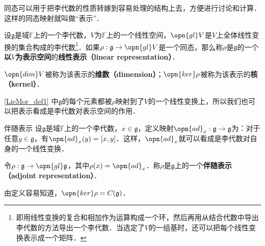 同态可以用于把李代数的性质转嫁到容易处理的结构上去，方便进行讨论和计算．这样的同态映射就叫做“表示”．

\begin{definition}{}\label{LieMor_def1}
设$\mathfrak{g}$是域$\mathbb{F}$上的一个李代数，$V$为$\mathbb{F}$上的一个线性空间，$\opn{gl}V$是$V$上全体线性变换的集合构成的李代数\footnote{即用线性变换的复合和相加作为运算构成一个环，然后再用从结合代数中导出李代数的方法导出一个李代数．当选定了$V$的一组基时，还可以把每个线性变换表示成一个矩阵．}．如果$\rho:\mathfrak{g}\to \opn{gl}V$是一个同态，那么称$\rho$是$\mathfrak{g}$的一个\textbf{以}$V$\textbf{为表示空间}的\textbf{线性表示（linear representation）}．

$\opn{dim} V$被称为该表示的\textbf{维数（dimension）}；$\opn{ker}\rho$被称为该表示的\textbf{核（kernel）}．
\end{definition}

\autoref{LieMor_def1} 中$\mathfrak{g}$的每个元素都被$\rho$映射到了$V$的一个线性变换上，所以我们也可以把表示看成是李代数对表示空间的作用．



\begin{example}{伴随表示}
设$\mathfrak{g}$是域$\mathbb{F}$上的一个李代数，$x\in\mathfrak{g}$，定义映射$\opn{ad}_x :\mathfrak{g}\to\mathfrak{g}$为：对于任意$y\in\mathfrak{g}$，有$\opn{ad}_x(y)=[x, y]$．这样，$\opn{ad}_x$就可以看成是李代数对自身的一个线性变换．

令$\rho:\mathfrak{g}\to\opn{gl}\mathfrak{g}$，其中$\rho(x)=\opn{ad}_x$．称$\rho$是$\mathfrak{g}$上的一个\textbf{伴随表示（adjoint representation）}．

由定义容易知道，$\opn{ker}\rho=C(\mathfrak{g})$．
\end{example}










